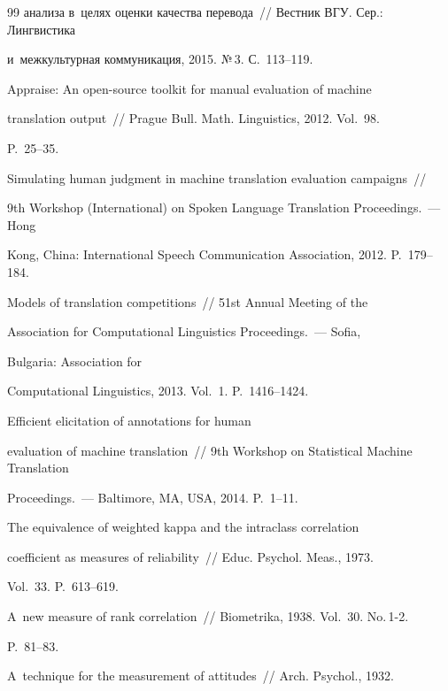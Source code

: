 {{\begin{thebibliography}{99}
анализа в~целях оценки качества перевода~/\!\!/ Вестник ВГУ. Сер.: Лингвистика 

и~межкультурная коммуникация, 2015. №\,3. С.~113--119. 


 Appraise: An open-source toolkit for manual evaluation of machine 

translation output~/\!\!/ Prague Bull. Math. Linguistics, 2012. Vol.~98. 

 P.~25--35.


 Simulating human judgment in machine translation evaluation campaigns~/\!\!/  

9th Workshop (International) on Spoken Language Translation Proceedings.~--- Hong 

Kong, China: International Speech Communication Association, 2012. P.~179--184.


 Models of translation competitions~/\!\!/ 51st Annual Meeting of the 

Association for Computational Linguistics Proceedings.~--- Sofia, 

Bulgaria: Association for 

Computational Linguistics, 2013. Vol.~1. P.~1416--1424.


 Efficient elicitation of annotations for human 

evaluation of machine translation~/\!\!/  9th Workshop on Statistical Machine Translation 

Proceedings.~--- Baltimore, MA, USA, 2014. P.~1--11.


 The equivalence of weighted kappa and the intraclass correlation 

coefficient as measures of reliability~/\!\!/ Educ. Psychol. Meas., 1973. 

Vol.~33. P.~613--619.


 A~new measure of rank correlation~/\!\!/ Biometrika, 1938. Vol.~30.  No.\,1-2. 

P.~81--83.


 A~technique for the measurement of attitudes~/\!\!/ Arch. Psychol., 1932. 


\end{thebibliography}}}

